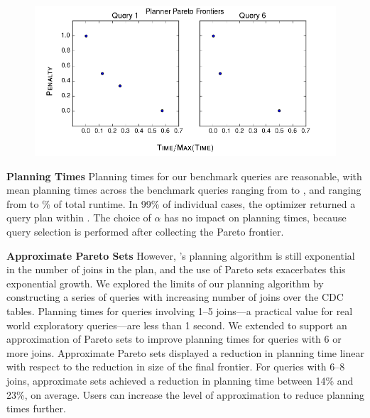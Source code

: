 {\begin{figure}
\centering
\includegraphics[scale=0.4]{figures/pareto_frontiers_plot.png}
\caption{
\label{fig:pareto-frontiers}
}
\end{figure}

\begin{sloppypar}
\textbf{Planning Times}\quad
Planning times for our benchmark queries are reasonable, with mean planning times across the
benchmark queries ranging from \planningtimelow{} to \planningtimehigh{}, and ranging from
\planningtimelowpct{} to \planningtimehighpct{}\% of total runtime. In 99\% of individual
cases, the optimizer returned a query plan within \planningtimepninetynine{}. The choice of
$\alpha$ has no impact on planning times, because query selection is performed after collecting
the Pareto frontier.
\end{sloppypar}

\textbf{Approximate Pareto Sets}\quad
However, \ProjectName{}'s planning algorithm is still exponential in the number of joins in the plan, and the use of Pareto sets exacerbates this exponential growth.
We explored the limits of our planning algorithm by constructing a series of queries with increasing number of joins over the CDC tables.
Planning times for queries involving 1--5 joins---a practical value for  real world exploratory queries---are less than 1 second.
We extended \ProjectName{} to support an approximation of Pareto sets to improve planning times for queries with 6 or more joins. Approximate Pareto sets
displayed a reduction in planning time linear with respect to the reduction in size of the final frontier. For queries with 6--8 joins, approximate sets achieved a reduction
in planning time between 14\% and 23\%, on average.  Users can increase the level of approximation to reduce planning times further.

}

